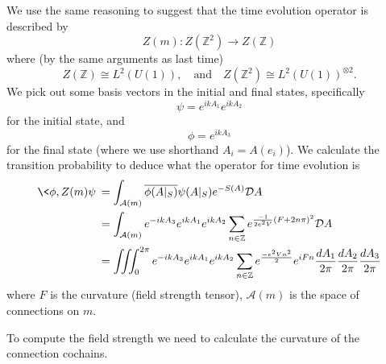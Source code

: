 We use the same reasoning to suggest that the time evolution
operator is described by
\begin{equation}%
Z(m):Z(\mathbb{Z}^{2})\to Z(\mathbb{Z})
\end{equation}
where (by the same arguments as last time)
\begin{equation}%
Z(\mathbb{Z})\cong L^{2}(U(1)),\quad\text{and}\quad
Z(\mathbb{Z}^{2})\cong L^{2}(U(1))^{\otimes 2}.
\end{equation}
We pick out some basis vectors in the initial and final states,
specifically
\begin{equation}%
\psi = e^{ikA_{1}}e^{ikA_{2}}
\end{equation}
for the initial state, and
\begin{equation}%
\phi = e^{ikA_{3}}
\end{equation}
for the final state (where we use shorthand $A_{i}=A(e_{i})$). We
calculate the transition probability to deduce what the operator
for time evolution is
\begin{subequations}
\begin{align}
\<\phi,Z(m)\psi\> &= \int_{\mathcal{A}(m)}\overline{\phi(A|_{S})}\psi(A|_{S})e^{-S(A)}\mathcal{D}A\\
&= \int_{\mathcal{A}(m)}
e^{-ikA_{3}}e^{ikA_{1}}e^{ikA_{2}}\sum_{n\in\mathbb{Z}}e^{\frac{-1}{2e^{2}V}(F+2n\pi)^{2}}\mathcal{D}A\\
&= \iiint^{2\pi}_{0}
e^{-ikA_{3}}e^{ikA_{1}}e^{ikA_{2}}\sum_{n\in\mathbb{Z}}e^{\frac{-e^{2}Vn^{2}}{2}}e^{iFn} \frac{dA_{1}}{2\pi}\frac{dA_{2}}{2\pi}\frac{dA_{3}}{2\pi}
\end{align}
\end{subequations}
where $F$ is the curvature (field strength tensor),
$\mathcal{A}(m)$ is the space of connections on $m$.

To compute the field strength we need to calculate the curvature
of the connection cochains.
